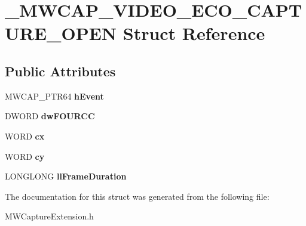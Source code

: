 \hypertarget{struct__MWCAP__VIDEO__ECO__CAPTURE__OPEN}{\section{\-\_\-\-M\-W\-C\-A\-P\-\_\-\-V\-I\-D\-E\-O\-\_\-\-E\-C\-O\-\_\-\-C\-A\-P\-T\-U\-R\-E\-\_\-\-O\-P\-E\-N Struct Reference}
\label{struct__MWCAP__VIDEO__ECO__CAPTURE__OPEN}
}
\subsection*{Public Attributes}
\begin{DoxyCompactItemize}
\item 
\hypertarget{struct__MWCAP__VIDEO__ECO__CAPTURE__OPEN_a38e4bd3b75ea506114a749ac1a5451fd}{M\-W\-C\-A\-P\-\_\-\-P\-T\-R64 {\bfseries h\-Event}}\label{struct__MWCAP__VIDEO__ECO__CAPTURE__OPEN_a38e4bd3b75ea506114a749ac1a5451fd}

\item 
\hypertarget{struct__MWCAP__VIDEO__ECO__CAPTURE__OPEN_a7394370ce8d83236b90760c3635f0850}{D\-W\-O\-R\-D {\bfseries dw\-F\-O\-U\-R\-C\-C}}\label{struct__MWCAP__VIDEO__ECO__CAPTURE__OPEN_a7394370ce8d83236b90760c3635f0850}

\item 
\hypertarget{struct__MWCAP__VIDEO__ECO__CAPTURE__OPEN_a89a0d87b45550f6a6a6a9fe8b2e4f8d7}{W\-O\-R\-D {\bfseries cx}}\label{struct__MWCAP__VIDEO__ECO__CAPTURE__OPEN_a89a0d87b45550f6a6a6a9fe8b2e4f8d7}

\item 
\hypertarget{struct__MWCAP__VIDEO__ECO__CAPTURE__OPEN_a1f4ee9c8e0513c1e80403461f6d7ca09}{W\-O\-R\-D {\bfseries cy}}\label{struct__MWCAP__VIDEO__ECO__CAPTURE__OPEN_a1f4ee9c8e0513c1e80403461f6d7ca09}

\item 
\hypertarget{struct__MWCAP__VIDEO__ECO__CAPTURE__OPEN_a72b4cb9317cbe7b00f445d31d47fedda}{L\-O\-N\-G\-L\-O\-N\-G {\bfseries ll\-Frame\-Duration}}\label{struct__MWCAP__VIDEO__ECO__CAPTURE__OPEN_a72b4cb9317cbe7b00f445d31d47fedda}

\end{DoxyCompactItemize}


The documentation for this struct was generated from the following file\-:\begin{DoxyCompactItemize}
\item 
M\-W\-Capture\-Extension.\-h\end{DoxyCompactItemize}
